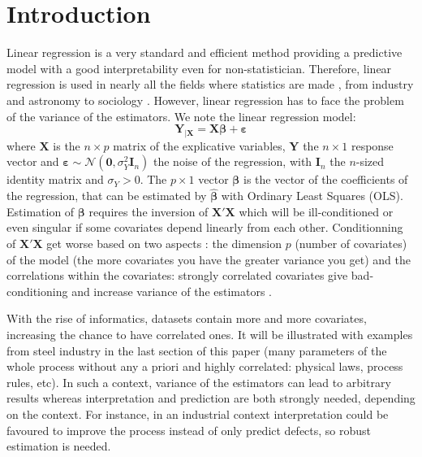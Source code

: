 \documentclass[11pt,a4paper]{article}
\begin{document}
\section{Introduction}
Linear regression is a very standard and efficient method providing a predictive model with a good interpretability even  for non-statistician. Therefore, linear regression is used in nearly all the fields where statistics are made \cite{montgomery2012introduction}, from industry and astronomy \cite{isobe1990linear} to sociology \cite{longford2012revision}.
However, linear regression has to face the problem of the variance of the estimators.
We note the linear regression model:
\begin{equation}
		\boldsymbol{Y}_{|\boldsymbol{X}}=\boldsymbol{X}\boldsymbol{\beta} + \boldsymbol{\varepsilon} \label{regressionsimple}
	\end{equation}
	where $\boldsymbol{X}$ is the $n\times p$ matrix of the explicative variables, $\boldsymbol{Y}$ the  $n\times 1$ response vector and $\boldsymbol{\varepsilon} \sim \mathcal{N}(\boldsymbol{0},\sigma_Y^2\boldsymbol{I}_n)$ the noise of the regression, with $\boldsymbol{I}_n$ the $n$-sized identity matrix and $\sigma_Y >0$. The $p\times 1$ vector $\boldsymbol{\beta}$ is the vector of the coefficients of the regression, that can be estimated by $\hat{\boldsymbol{\beta}}$ with Ordinary Least Squares (\textsc{OLS}). %
	Estimation of $\boldsymbol{\beta}$ requires the inversion of $\boldsymbol{X}'\boldsymbol{X}$ which will be ill-conditioned or even singular if some covariates depend linearly from each other. 
Conditionning of $\boldsymbol{X}'\boldsymbol{X}$ get worse based on two aspects : the dimension $p$ (number of covariates) of the model (the more covariates you have the greater variance you get)
	 and the correlations within the covariates: strongly correlated covariates give bad-conditioning and increase variance of the estimators .

	With the rise of informatics, datasets contain more and more covariates, %
	increasing the chance to have correlated ones.  It will be illustrated with examples from steel industry in the last section of this paper (many parameters of the whole process without any a priori and highly correlated: physical laws, process rules, etc). 
	 In such a context, variance of the estimators can lead to arbitrary results whereas interpretation and prediction are both strongly needed, depending on the context. For instance, in an industrial context interpretation could be favoured to improve the process instead of only predict defects, so robust estimation is needed.
		~\\	~\\
		
\end{document}
